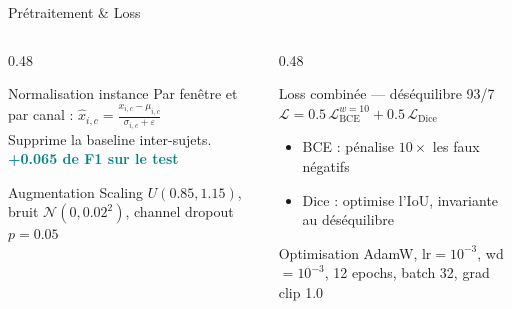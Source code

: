 \documentclass[aspectratio=169, 10pt]{beamer}
\begin{document}
\begin{frame}{Prétraitement \& Loss}
    \begin{columns}[T]
        \begin{column}{0.48\textwidth}
            \begin{block}{\small Normalisation instance}
                \small Par fenêtre et par canal :
                $\hat{x}_{i,c} = \frac{x_{i,c} - \mu_{i,c}}{\sigma_{i,c} + \varepsilon}$\\[2pt]
                Supprime la baseline inter-sujets.\\
                \textcolor{Teal}{\textbf{+0.065 de F1 sur le test}}
            \end{block}
            \vspace{0.15cm}
            \begin{block}{\small Augmentation}
                \small Scaling $U(0.85,1.15)$,\;
                bruit $\mathcal{N}(0,0.02^2)$,\;
                channel dropout $p\!=\!0.05$
            \end{block}
        \end{column}
        \begin{column}{0.48\textwidth}
            \begin{block}{\small Loss combinée --- déséquilibre 93/7}
                \small $\mathcal{L} = 0.5\,\mathcal{L}_{\text{BCE}}^{w=10}
                                     + 0.5\,\mathcal{L}_{\text{Dice}}$
                \begin{itemize}\setlength\itemsep{1pt}\small
                    \item BCE : pénalise $10\times$ les faux négatifs
                    \item Dice : optimise l'IoU, invariante au déséquilibre
                \end{itemize}
            \end{block}
            \vspace{0.15cm}
            \begin{block}{\small Optimisation}
                \small AdamW, lr$=10^{-3}$, wd$=10^{-3}$,
                12 epochs, batch 32, grad clip 1.0
            \end{block}
        \end{column}
    \end{columns}
\end{frame}
\end{document}
